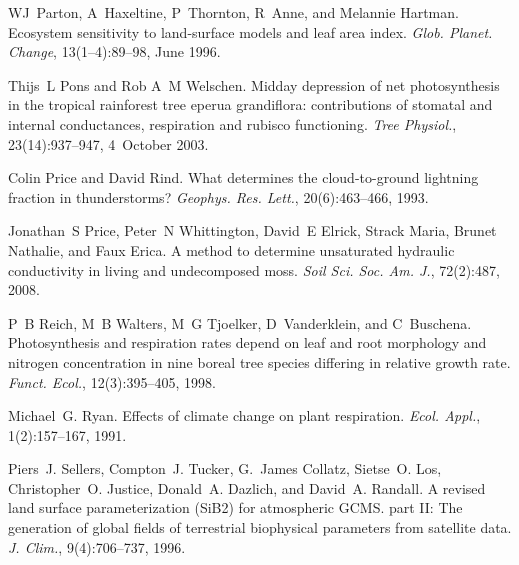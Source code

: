 \begin{DoxyDescription}
\item[\label{_CITEREF_Parton1996-zv}%
\mbox{[}47\mbox{]}]W\+J~Parton, A~Haxeltine, P~Thornton, R~Anne, and Melannie Hartman. Ecosystem sensitivity to land-\/surface models and leaf area index. {\itshape Glob. Planet. Change}, 13(1–4)\+:89--98, June 1996. 


\item[\label{_CITEREF_Pons2003-f26}%
\mbox{[}48\mbox{]}]Thijs~L Pons and Rob A~M Welschen. Midday depression of net photosynthesis in the tropical rainforest tree eperua grandiflora\+: contributions of stomatal and internal conductances, respiration and rubisco functioning. {\itshape Tree Physiol.}, 23(14)\+:937--947, 4~October 2003.


\item[\label{_CITEREF_Price1993-fm}%
\mbox{[}49\mbox{]}]Colin Price and David Rind. What determines the cloud-\/to-\/ground lightning fraction in thunderstorms? {\itshape Geophys. Res. Lett.}, 20(6)\+:463--466, 1993. 


\item[\label{_CITEREF_Price2008-fr}%
\mbox{[}50\mbox{]}]Jonathan~S Price, Peter~N Whittington, David~E Elrick, Strack Maria, Brunet Nathalie, and Faux Erica. A method to determine unsaturated hydraulic conductivity in living and undecomposed moss. {\itshape Soil Sci. Soc. Am. J.}, 72(2)\+:487, 2008. 


\item[\label{_CITEREF_Reich1998-zr}%
\mbox{[}51\mbox{]}]P~B Reich, M~B Walters, M~G Tjoelker, D~Vanderklein, and C~Buschena. Photosynthesis and respiration rates depend on leaf and root morphology and nitrogen concentration in nine boreal tree species differing in relative growth rate. {\itshape Funct. Ecol.}, 12(3)\+:395--405, 1998. 


\item[\label{_CITEREF_Ryan1991-ai}%
\mbox{[}52\mbox{]}]Michael~G. Ryan. Effects of climate change on plant respiration. {\itshape Ecol. Appl.}, 1(2)\+:157--167, 1991. 


\item[\label{_CITEREF_Sellers1996-bh}%
\mbox{[}53\mbox{]}]Piers~J. Sellers, Compton~J. Tucker, G.~James Collatz, Sietse~O. Los, Christopher~O. Justice, Donald~A. Dazlich, and David~A. Randall. A revised land surface parameterization (Si\+B2) for atmospheric G\+C\+M\+S. part I\+I\+: The generation of global fields of terrestrial biophysical parameters from satellite data. {\itshape J. Clim.}, 9(4)\+:706--737, 1996. 



\end{DoxyDescription}
